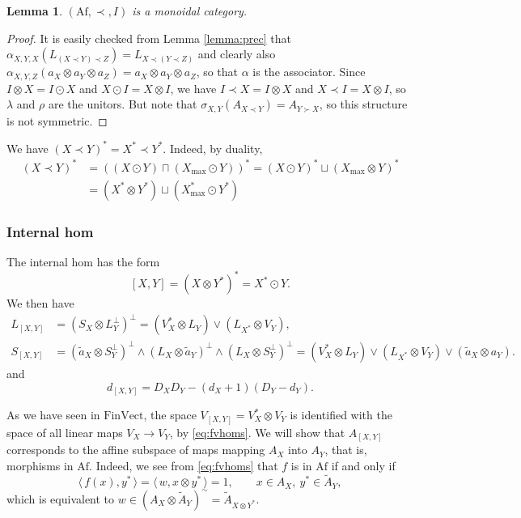 \documentclass[12pt]{article}
\newtheorem{lemma}{Lemma}
\theoremstyle{definition}
\theoremstyle{remark}
\def\<{\langle\,}
\def\>{\,\rangle}
\def \Af{\mathrm{Af}}
\def \FV{\mathrm{FinVect}}
\begin{document}
\begin{lemma}\label{lemma:precmonoidal} $(\Af,\prec,I)$ is a monoidal category.  

\end{lemma}

\begin{proof} It is easily checked from Lemma \ref{lemma:prec} that
$\alpha_{X,Y,X}(L_{(X\prec Y)\prec Z})=L_{X\prec(Y\prec Z)}$ and clearly also
$\alpha_{X,Y,Z}(a_X\otimes a_Y\otimes a_Z)=a_X\otimes a_Y\otimes a_Z$, so that $\alpha$ is
the associator. Since $I\otimes X=I\odot X$ and $X\odot I=X\otimes I$, we have 
$I\prec X=I\otimes X$ and $X\prec I=X\otimes I$, so $\lambda$ and $\rho$ are the
unitors. But note that $\sigma_{X,Y}(A_{X\prec Y})=A_{Y\succ X}$, so this structure is
not symmetric. 

\end{proof}

We have $(X\prec Y)^*=X^*\prec Y^*$. Indeed, by duality,
\begin{align*}
(X\prec Y)^*&=((X\odot Y)\sqcap (X_{\max}\odot Y))^*=(X\odot Y)^*\sqcup (X_{\max}\otimes
Y)^*\\
&= (X^*\otimes Y^*)\sqcup (X_{\max}^*\odot Y^*)
\end{align*}




\subsubsection{Internal hom}

The internal hom has the form
\begin{equation}\label{eq:ihom}
[X,Y]=(X\otimes Y^*)^*=X^*\odot Y.
\end{equation}
We then have 
\begin{align*}
L_{[X,Y]}&=(S_X\otimes L_Y^\perp)^\perp= (V_X^*\otimes L_Y)\vee (L_{X^*}\otimes V_Y), \\
S_{[X,Y]}&=(\tilde a_X\otimes
S_Y^\perp)^\perp\wedge(L_X\otimes \tilde a_Y)^\perp\wedge (L_X\otimes
S_Y^\perp)^\perp=(V_X^*\otimes L_Y)\vee (L_{X^*}\otimes V_Y)\vee (\tilde a_X\otimes a_Y).
\end{align*}
and
\[
d_{[X,Y]}=D_XD_Y-(d_X+1)(D_Y-d_Y).
\]


As we have seen in $\FV$, the space $V_{[X,Y]}=V_X^*\otimes V_Y$ is identified with the
space of all linear maps $V_X\to V_Y$, by \eqref{eq:fvhoms}. We will show that $A_{[X,Y]}$ corresponds to the
affine subspace of maps mapping $A_X$ into $A_Y$, that is, morphisms in $\Af$. Indeed, we see from \eqref{eq:fvhoms}
that $f$ is in $\Af$ if and only if 
\[
\<f(x),y^*\>=\<w,x\otimes y^*\>=1, \qquad x\in A_X,\ y^*\in \tilde A_Y,
\]
which is equivalent to $w\in (A_X\otimes \tilde A_Y)^\sim=\tilde A_{X\otimes Y^*}$. 
\end{document}
